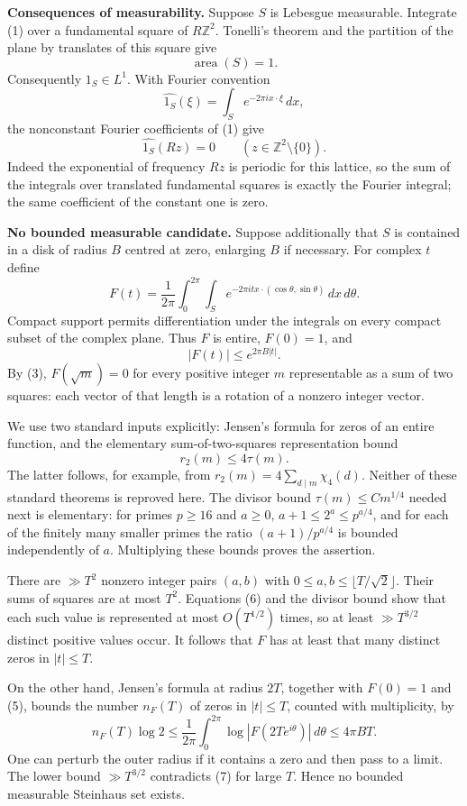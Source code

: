 \textbf{Consequences of measurability.} Suppose $S$ is Lebesgue measurable. Integrate (1) over a fundamental square of $R\mathbb Z^2$. Tonelli's theorem and the partition of the plane by translates of this square give
\[
\operatorname{area}(S)=1.
\tag{2}
\]
Consequently $1_S\in L^1$. With Fourier convention
\[
\widehat{1_S}(\xi)=\int_S e^{-2\pi i x\cdot\xi}\,dx,
\]
the nonconstant Fourier coefficients of (1) give
\[
\widehat{1_S}(Rz)=0\qquad(z\in\mathbb Z^2\setminus\{0\}).
\tag{3}
\]
Indeed the exponential of frequency $Rz$ is periodic for this lattice, so the sum of the integrals over translated fundamental squares is exactly the Fourier integral; the same coefficient of the constant one is zero.

\textbf{No bounded measurable candidate.} Suppose additionally that $S$ is contained in a disk of radius $B$ centred at zero, enlarging $B$ if necessary. For complex $t$ define
\[
F(t)=\frac1{2\pi}\int_0^{2\pi}\int_S
 e^{-2\pi i t x\cdot(\cos\theta,\sin\theta)}\,dx\,d\theta.
\tag{4}
\]
Compact support permits differentiation under the integrals on every compact subset of the complex plane. Thus $F$ is entire, $F(0)=1$, and
\[
|F(t)|\leq e^{2\pi B|t|}.
\tag{5}
\]
By (3), $F(\sqrt m)=0$ for every positive integer $m$ representable as a sum of two squares: each vector of that length is a rotation of a nonzero integer vector.

We use two standard inputs explicitly: Jensen's formula for zeros of an entire function, and the elementary sum-of-two-squares representation bound
\[
r_2(m)\leq4\tau(m).
\tag{6}
\]
The latter follows, for example, from $r_2(m)=4\sum_{d\mid m}\chi_4(d)$. Neither of these standard theorems is reproved here. The divisor bound $\tau(m)\leq C m^{1/4}$ needed next is elementary: for primes $p\geq16$ and $a\geq0$, $a+1\leq2^a\leq p^{a/4}$, and for each of the finitely many smaller primes the ratio $(a+1)/p^{a/4}$ is bounded independently of $a$. Multiplying these bounds proves the assertion.

There are $\gg T^2$ nonzero integer pairs $(a,b)$ with $0\leq a,b\leq\lfloor T/\sqrt2\rfloor$. Their sums of squares are at most $T^2$. Equations (6) and the divisor bound show that each such value is represented at most $O(T^{1/2})$ times, so at least $\gg T^{3/2}$ distinct positive values occur. It follows that $F$ has at least that many distinct zeros in $|t|\leq T$.

On the other hand, Jensen's formula at radius $2T$, together with $F(0)=1$ and (5), bounds the number $n_F(T)$ of zeros in $|t|\leq T$, counted with multiplicity, by
\[
n_F(T)\log2
\leq\frac1{2\pi}\int_0^{2\pi}\log|F(2Te^{i\theta})|\,d\theta
\leq4\pi BT.
\tag{7}
\]
One can perturb the outer radius if it contains a zero and then pass to a limit. The lower bound $\gg T^{3/2}$ contradicts (7) for large $T$. Hence no bounded measurable Steinhaus set exists.

